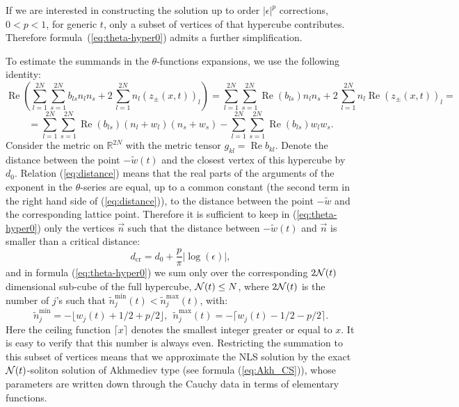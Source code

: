 \documentclass[12pt]{article}
\newcommand{\RR}{\mathbb R}
\renewcommand{\Re}{\mathop{\mathrm{Re}}}
\begin{document}
If we are interested in constructing the solution up to order $|\epsilon|^{p}$ corrections, $0<p<1$, for generic $t$, only a subset of vertices of that hypercube contributes. Therefore formula~(\ref{eq:theta-hyper0}) admits a further simplification.

To estimate the summands in the $\theta$-functions expansions,  we use the following identity:
$$
\Re\left(\sum\limits_{l=1}^{2N} \sum\limits_{s=1}^{2N} b_{ls}n_ln_s +  2\, \sum\limits_{l=1}^{2N}  n_l (  z_{\pm}(x,t))_l \right)=
\sum\limits_{l=1}^{2N} \sum\limits_{s=1}^{2N} \Re(b_{ls})n_ln_s +  2\, \sum\limits_{l=1}^{2N}  n_l \Re( z_{\pm}(x,t))_l  =
$$
\begin{equation}
\label{eq:distance}
=
\sum\limits_{l=1}^{2N} \sum\limits_{s=1}^{2N} \Re(b_{ls})( n_l+ w_l)( n_s+ w_s) - \sum\limits_{l=1}^{2N} \sum\limits_{s=1}^{2N} \Re(b_{ls}) w_l w_s.  
\end{equation}
Consider the metric on $\RR^{2N}$ with the metric tensor $g_{kl}=\Re b_{kl}$. Denote the distance between the point $-\tilde w(t)$ and the closest vertex of this hypercube by $d_0$. Relation (\ref{eq:distance}) means that the real parts of the arguments of the exponent in the $\theta$-series are equal, up to a common constant (the second term in the right hand side of (\ref{eq:distance})), to the distance between the point $-\tilde w$ and the corresponding lattice point. Therefore it is sufficient to keep in (\ref{eq:theta-hyper0}) only the vertices $\vec n$ such that the distance between  $-\tilde w(t)$ and $\vec n$ is smaller than a critical distance:
$$
d_{\mbox{cr}} = d_0 +\frac{p}{\pi}\left|\log(\epsilon) \right|,
$$
and in formula (\ref{eq:theta-hyper0}) we sum only over the corresponding $2{\cal N}(t)$ dimensional sub-cube of the full hypercube, ${\cal N}(t)\le N$, where $2{\cal N}(t)$ is the number of $j$'s such that $\tilde n_j^{\mbox{min}}(t)< \tilde n_j^{\mbox{max}}(t)$, with:
$$
\tilde n_j^{\mbox{min}}=-\lfloor w_j(t) +1/2 + p/2 \rfloor, \ \  \tilde n_j^{\mbox{max}}(t) = -\lceil w_j(t) -1/2 -p/2 \rceil.
$$
Here the ceiling function $\lceil x \rceil$ denotes the smallest integer greater or equal to $x$. It is easy to verify that this number is always even. Restricting the summation to this subset of vertices means that we approximate the NLS solution by the exact ${\cal N}(t)$-soliton solution of Akhmediev type (see formula (\ref{eq:Akh_CS})), whose parameters are written down through the Cauchy data in terms of elementary functions.
\end{document}
